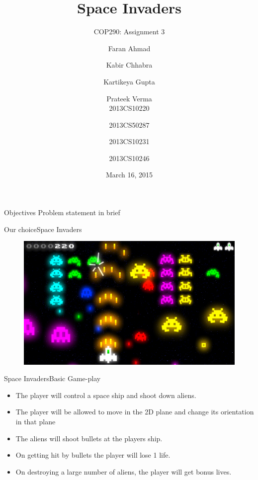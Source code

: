 \documentclass{beamer}
\title[COP 290]{Space Invaders}
\subtitle{COP290: Assignment 3}
\author[Faran \and Kabir \and Kartikeya \and Prateek]{Faran Ahmad \and Kabir Chhabra \and Kartikeya Gupta \and Prateek Verma \\
  2013CS10220 \and 2013CS50287 \and 2013CS10231 \and 2013CS10246}
\institute[IITD] %
{
  Department of Computer Science and Engineering\\
  IIT Delhi
}
\date{March 16, 2015}
\begin{document}
\begin{frame}
  \titlepage
\end{frame}

\begin{frame}{Objectives}{}
	Problem statement in brief
\end{frame}

\begin{frame}{Our choice}{Space Invaders}
    \begin{figure}[ht!]
      \centering
          \includegraphics[width=1.0\linewidth]{gameplay.png}
    \end{figure}
\end{frame}


\begin{frame}{Space Invaders}{Basic Game-play}
  \begin{itemize}
  	\item The player will control a space ship and shoot down aliens.
  	\item The player will be allowed to move in the 2D plane and change its orientation in that plane 
  	\item The aliens will shoot bullets at the players ship.
  	\item On getting hit by bullets the player will lose 1 life.
  	\item On destroying a large number of aliens, the player will get bonus lives.
  \end{itemize}
\end{frame}
\end{document}
